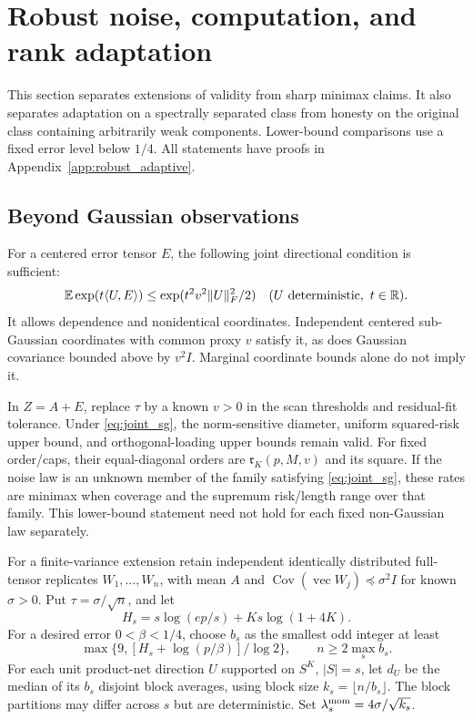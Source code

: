 \section{Robust noise, computation, and rank adaptation}\label{sec:robust_adaptive}

This section separates extensions of validity from sharp minimax claims. It also separates adaptation on a spectrally separated class from honesty on the original class containing arbitrarily weak components. Lower-bound comparisons use a fixed error level below $1/4$. All statements have proofs in Appendix~\ref{app:robust_adaptive}.

\subsection{Beyond Gaussian observations}

For a centered error tensor $E$, the following joint directional condition is sufficient:
\begin{equation}\label{eq:joint_sg}
 \mathbb E\exp(t\langle U,E\rangle)\le\exp(t^2v^2\lVert U\rVert_F^2/2)
 \quad(U\text{ deterministic},\ t\in\mathbb R).
\end{equation}
It allows dependence and nonidentical coordinates. Independent centered sub-Gaussian coordinates with common proxy $v$ satisfy it, as does Gaussian covariance bounded above by $v^2I$. Marginal coordinate bounds alone do not imply it.

\begin{theorem}\label{thm:sg_full}
In $Z=A+E$, replace $\tau$ by a known $v>0$ in the scan thresholds and residual-fit tolerance. Under \eqref{eq:joint_sg}, the norm-sensitive diameter, uniform squared-risk upper bound, and orthogonal-loading upper bounds remain valid. For fixed order/caps, their equal-diagonal orders are $\mathfrak r_K(p,M,v)$ and its square. If the noise law is an unknown member of the family satisfying \eqref{eq:joint_sg}, these rates are minimax when coverage and the supremum risk/length range over that family. This lower-bound statement need not hold for each fixed non-Gaussian law separately.
\end{theorem}

For a finite-variance extension retain independent identically distributed full-tensor replicates $W_1,\ldots,W_n$, with mean $A$ and
$\operatorname{Cov}(\operatorname{vec}W_j)\preceq\sigma^2I$ for known $\sigma>0$.
Put $\tau=\sigma/\sqrt n$, and let
\[
 H_s=s\log(ep/s)+Ks\log(1+4K).
\]
For a desired error $0<\beta<1/4$, choose $b_s$ as the smallest odd integer at least
\begin{equation}\label{eq:mom_blocks}
 \max\{9,[H_s+\log(p/\beta)]/\log2\},\qquad n\ge2\max_s b_s.
\end{equation}
For each unit product-net direction $U$ supported on $S^K$, $|S|=s$, let $d_U$ be the median of its $b_s$ disjoint block averages, using block size $k_s=\lfloor n/b_s\rfloor$. The block partitions may differ across $s$ but are deterministic. Set $\lambda_s^{\rm mom}=4\sigma/\sqrt{k_s}$.

